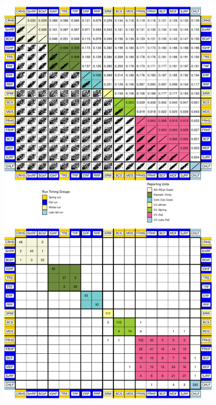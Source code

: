 \begin{figure}
\begin{center}
\includegraphics[width=\columnwidth]{images/gsi_and_fst_fig-crop.pdf}
\end{center}
\caption[\gsicap]{\gsicap}
\label{fig:gsi}
\end{figure}



